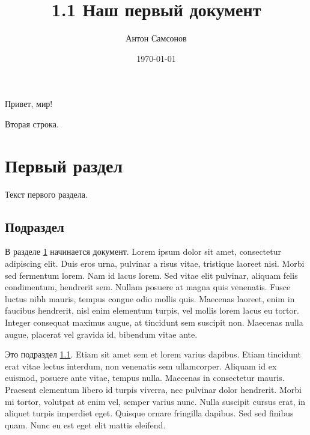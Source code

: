 \documentclass[a4paper,12pt]{article}
\author{Антон Самсонов}
\title{1.1 Наш первый документ}
\date{\today}
\begin{document}

\maketitle

Привет, мир!

Вторая строка.


\section{Первый раздел}\label{1}

Текст первого раздела.


\subsection{Подраздел}\label{2}

В разделе \ref{1} начинается документ. Lorem ipsum dolor sit amet, consectetur adipiscing elit. Duis eros urna, pulvinar a risus vitae, tristique laoreet nisi. Morbi sed fermentum lorem. Nam id lacus lorem. Sed vitae elit pulvinar, aliquam felis condimentum, hendrerit sem. Nullam posuere at magna quis venenatis. Fusce luctus nibh mauris, tempus congue odio mollis quis. Maecenas laoreet, enim in faucibus hendrerit, nisl enim elementum turpis, vel mollis lorem lacus eu tortor. Integer consequat maximus augue, at tincidunt sem suscipit non. Maecenas nulla augue, placerat vel gravida id, bibendum vitae ante.

Это подраздел \ref{2}. Etiam sit amet sem et lorem varius dapibus. Etiam tincidunt erat vitae lectus interdum, non venenatis sem ullamcorper. Aliquam id ex euismod, posuere ante vitae, tempus nulla. Maecenas in consectetur mauris. Praesent elementum libero id turpis viverra, nec pulvinar dolor hendrerit. Morbi mi tortor, volutpat at enim vel, semper varius nunc. Nulla suscipit cursus erat, in aliquet turpis imperdiet eget. Quisque ornare fringilla dapibus. Sed sed finibus quam. Nunc eu est eget elit mattis eleifend.
\end{document}

